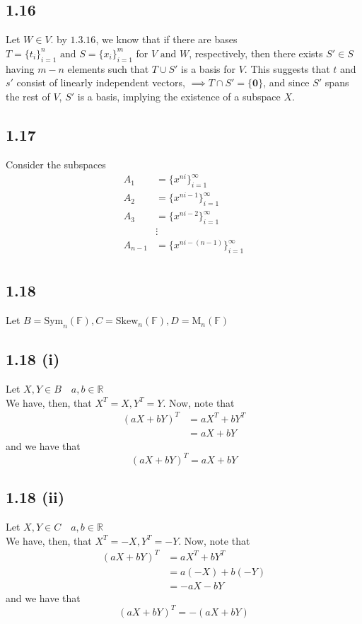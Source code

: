 \documentclass[letterpaper,12pt]{article}
\theoremstyle{definition}
\begin{document}
\subsection*{1.16}
Let $W \in V$. by $1.3.16$, we know that if there are bases $T = \{t_i\}_{i=1}^n  \text{ and } S = \{x_i\}_{i=1}^m$ for $V \text{ and } W$, respectively, then there exists $S' \in S$ having $m-n$ elements such that $T \cup S'$ is a basis for $V$.
This suggests that $t$ and $s'$ consist of linearly independent vectors, $\implies T \cap S' = \{\mathbf{0}\}$, and since $S'$ spans the rest of $V$, $S'$ is a basis, implying the existence of a subspace $X$. 

\subsection*{1.17}
Consider the subspaces 
\begin{align*}
    A_1 &= \{x^{ni}\}_{i=1}^\infty\\
    A_2 &= \{x^{ni-1}\}_{i=1}^\infty\\
    A_3 &= \{x^{ni-2}\}_{i=1}^\infty\\
    &\vdots\\
    A_{n-1} &= \{x^{ni-(n-1)}\}_{i=1}^\infty\\
\end{align*}

\subsection*{1.18}
Let $B = \text{Sym}_n (\mathbb{F}),C = \text{Skew}_n (\mathbb{F}), D = \text{M}_n (\mathbb{F})$ 

\subsection*{1.18 (i)}
Let $X,Y \in B \quad a,b \in \mathbb{R}$ \\
We have, then, that $X^T = X, Y^T = Y$. Now, note that 
\begin{align}
(aX + bY)^T  &= aX^T + bY^T \\ &= aX + bY
\end{align}
and we have that 
\[(aX + bY)^T  = aX + bY\]

\subsection*{1.18 (ii)}
Let $X,Y \in C \quad a,b \in \mathbb{R}$ \\
We have, then, that $X^T = -X, Y^T = -Y$. Now, note that 
\begin{align}
(aX + bY)^T  &= aX^T + bY^T \\ &=  a(-X) +  b(-Y) \\ &= - aX - bY
\end{align}
and we have that 
\[(aX + bY)^T  = - (aX + bY)\]
\end{document}
